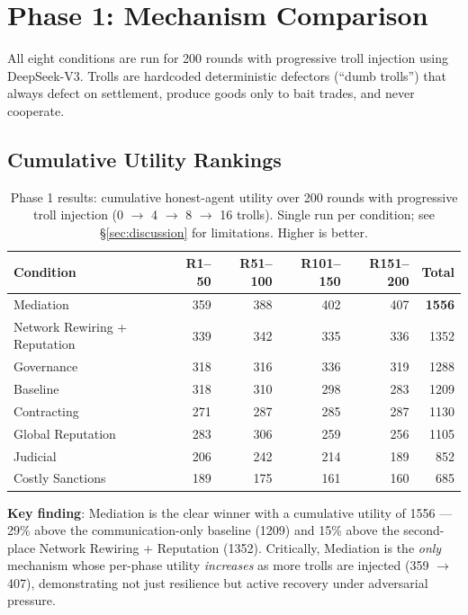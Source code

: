 \documentclass{article}
\begin{document}
\section{Phase 1: Mechanism Comparison}
\label{sec:phase1}

All eight conditions are run for 200 rounds with progressive troll injection using DeepSeek-V3. Trolls are hardcoded deterministic defectors (``dumb trolls'') that always defect on settlement, produce goods only to bait trades, and never cooperate.

\subsection{Cumulative Utility Rankings}

\begin{table}[H]
\centering
\begin{tabular}{@{}lrrrrr@{}}
\toprule
Condition & R1--50 & R51--100 & R101--150 & R151--200 & \textbf{Total} \\
\midrule
Mediation                         & 359 & 388 & 402 & 407 & \textbf{1556} \\
Network Rewiring + Reputation     & 339 & 342 & 335 & 336 & 1352 \\
Governance                        & 318 & 316 & 336 & 319 & 1288 \\
Baseline                          & 318 & 310 & 298 & 283 & 1209 \\
Contracting                       & 271 & 287 & 285 & 287 & 1130 \\
Global Reputation                 & 283 & 306 & 259 & 256 & 1105 \\
Judicial                          & 206 & 242 & 214 & 189 &  852 \\
Costly Sanctions                  & 189 & 175 & 161 & 160 &  685 \\
\bottomrule
\end{tabular}
\caption{Phase 1 results: cumulative honest-agent utility over 200 rounds with progressive troll injection (0 $\to$ 4 $\to$ 8 $\to$ 16 trolls). Single run per condition; see \S\ref{sec:discussion} for limitations. Higher is better.}
\label{tab:phase1_results}
\end{table}

\textbf{Key finding}: Mediation is the clear winner with a cumulative utility of 1556 --- 29\% above the communication-only baseline (1209) and 15\% above the second-place Network Rewiring + Reputation (1352). Critically, Mediation is the \textit{only} mechanism whose per-phase utility \textit{increases} as more trolls are injected (359 $\to$ 407), demonstrating not just resilience but active recovery under adversarial pressure.
\end{document}
